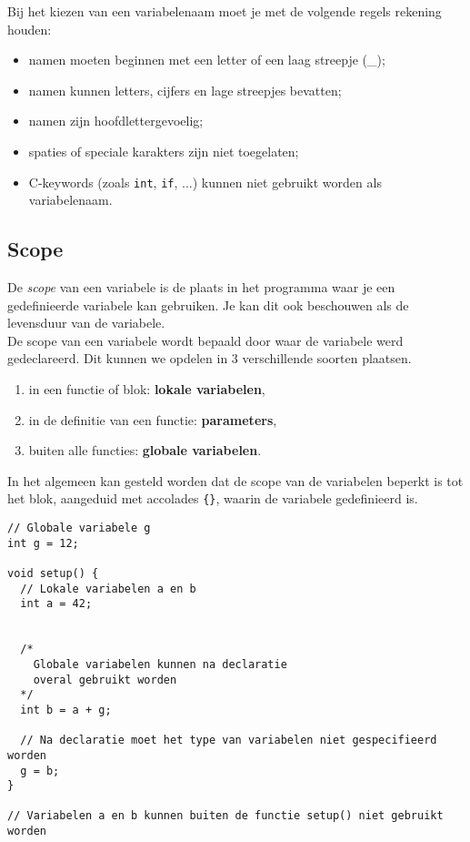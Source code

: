 \documentclass[11pt,fleqn]{book} %
\def\Cpp{{C\nolinebreak[4]\hspace{-.05em}\raisebox{.4ex}{\tiny\bf ++}}}
\begin{document}
\noindent Bij het kiezen van een variabelenaam moet je met de volgende regels rekening houden:
\begin{itemize}
	\item namen moeten beginnen met een letter of een laag streepje (\_);
	\item namen kunnen letters, cijfers en lage streepjes bevatten;
	\item namen zijn hoofdlettergevoelig;
	\item spaties of speciale karakters zijn niet toegelaten;
	\item \Cpp{}-keywords (zoals \texttt{int}, \texttt{if}, ...) kunnen niet gebruikt worden als variabelenaam.
\end{itemize}


\subsection{Scope}
De \emph{scope} van een variabele is de plaats in het programma waar je een gedefinieerde variabele kan gebruiken. Je kan dit ook beschouwen als de levensduur van de variabele.\\

\noindent
De scope van een variabele wordt bepaald door waar de variabele werd gedeclareerd. Dit kunnen we opdelen in 3 verschillende soorten plaatsen.

\begin{enumerate}
	\item in een functie of blok: \textbf{lokale variabelen},
	\item in de definitie van een functie: \textbf{parameters},
	\item buiten alle functies: \textbf{globale variabelen}.
\end{enumerate}

\noindent
In het algemeen kan gesteld worden dat de scope van de variabelen beperkt is tot het blok, aangeduid met accolades \texttt{\{\}}, waarin de variabele gedefinieerd is.

\begin{example}
	\phantom{ }
	\begin{verbatim}
// Globale variabele g
int g = 12;

void setup() {
  // Lokale variabelen a en b
  int a = 42;
  
  
  /*
    Globale variabelen kunnen na declaratie 
    overal gebruikt worden
  */
  int b = a + g;
  
  // Na declaratie moet het type van variabelen niet gespecifieerd worden
  g = b;
}

// Variabelen a en b kunnen buiten de functie setup() niet gebruikt worden

	\end{verbatim}
\end{example}
\end{document}
